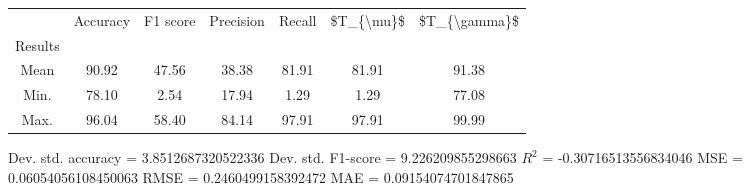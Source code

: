 \begin{tabular}{|c|c|c|c|c|c|c|}
\toprule
{} &  Accuracy &  F1 score &  Precision &  Recall &  \$T\_\{\textbackslash mu\}\$ &  \$T\_\{\textbackslash gamma\}\$ \\
Results &           &           &            &         &            &               \\
\hline
Mean    &     90.92 &     47.56 &      38.38 &   81.91 &      81.91 &         91.38 \\
Min.    &     78.10 &      2.54 &      17.94 &    1.29 &       1.29 &         77.08 \\
Max.    &     96.04 &     58.40 &      84.14 &   97.91 &      97.91 &         99.99 \\
\bottomrule
\end{tabular}

 Dev. std. accuracy = 3.8512687320522336
 Dev. std. F1-score = 9.226209855298663
 $R^2$ = -0.30716513556834046
 MSE = 0.06054056108450063
 RMSE = 0.2460499158392472
 MAE = 0.09154074701847865